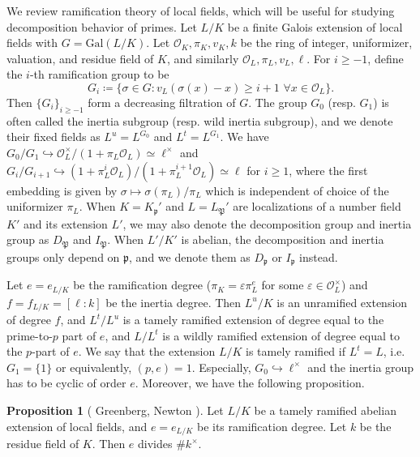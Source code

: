 \documentclass[letterpaper, 10pt]{article}
\newcommand{\Gal}{\mathrm{Gal}}
\newcommand{\cO}{\mathcal{O}}
\newcommand{\frp}{\mathfrak{p}}
\newcommand{\1}{\mathds{1}}	%
\theoremstyle{definition}
\newtheorem{proposition}[theorem]{Proposition}
\theoremstyle{remark}
\begin{document}
We review ramification theory of local fields, which will be useful for studying decomposition behavior of primes.
Let $L / K$ be a finite Galois extension of local fields with $G = \Gal(L / K)$.
Let $\cO_K, \pi_K, v_K, k$ be the ring of integer, uniformizer, valuation, and residue field of $K$, and similarly $\cO_L, \pi_L, v_L, \ell$.
For $i \ge -1$, define the $i$-th ramification group to be
\begin{equation}
    G_i \coloneqq \{\sigma \in G: v_L(\sigma(x) - x) \ge i + 1 \,\,\forall x \in \cO_L\}.
\end{equation}
Then $\{ G_i \}_{i \ge -1}$ form a decreasing filtration of $G$.
The group $G_0$ (resp. $G_1$) is often called the inertia subgroup (resp. wild inertia subgroup), and we denote their fixed fields as $L^u = L^{G_0}$ and $L^t = L^{G_1}$.
We have $G_0 / G_1 \hookrightarrow \cO_L^\times / (1 + \pi_L \cO_L) \simeq \ell^\times$ and $G_{i} / G_{i+1} \hookrightarrow (1 + \pi_L^{i} \cO_L) / (1 + \pi_L^{i+1} \cO_L) \simeq \ell$ for $i \ge 1$, where the first embedding is given by $\sigma \mapsto \sigma(\pi_L) / \pi_L$ which is independent of choice of the uniformizer $\pi_L$.
When $K = K_{\mathfrak{p}}'$ and $L = L_\mathfrak{P}'$ are localizations of a number field $K'$ and its extension $L'$, we may also denote the decomposition group and inertia group as $D_{\mathfrak{P}}$ and $I_{\mathfrak{P}}$.
When $L'/K'$ is abelian, the decomposition and inertia groups only depend on $\frp$, and we denote them as $D_{\frp}$ or $I_\frp$ instead.

Let $e = e_{L/K}$ be the ramification degree ($\pi_K = \varepsilon\pi_L^e$ for some $\varepsilon \in \cO_L^\times$) and $f = f_{L/K} = [\ell : k]$ be the inertia degree.
Then $L^u /  K$ is an unramified extension of degree $f$, and $L^t / L^u$ is a tamely ramified extension of degree equal to the prime-to-$p$ part of $e$, and $L / L^t$ is a wildly ramified extension of degree equal to the $p$-part of $e$.
We say that the extension $L / K$ is tamely ramified if $L^t = L$, i.e. $G_1 = \{1\}$ or equivalently, $(p, e) = 1$.
Especially, $G_{0} \hookrightarrow \ell^\times$ and the inertia group has to be cyclic of order $e$. 
Moreover, we have the following proposition.

\begin{proposition}[{ Greenberg\cite[Lemma 1]{greenberg1974elementary},  Newton \cite[Proposition 2.2.9]{newton2012explicit}}]
\label{prop:newton}
    Let $L/K$ be a tamely ramified abelian extension of local fields, and $e = e_{L/K}$ be its ramification degree.
    Let $k$ be the residue field of $K$.
    Then $e$ divides $\#k^\times$.
\end{proposition}
\end{document}
